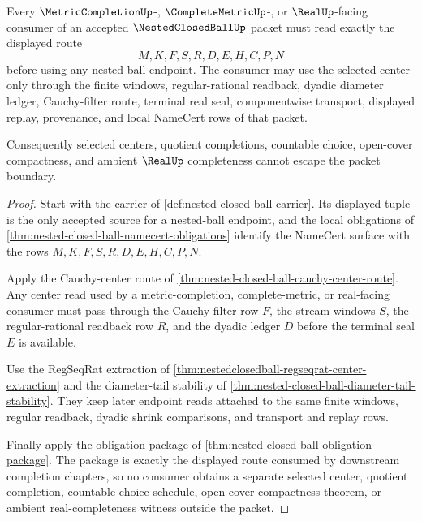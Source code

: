 \begin{theorem}
\label{thm:nested-closed-ball-consumer-nonescape}
Every $\MetricCompletionUp$-, $\CompleteMetricUp$-, or $\RealUp$-facing consumer of an accepted $\NestedClosedBallUp$ packet must read exactly the displayed route
$$
M,K,F,S,R,D,E,H,C,P,N
$$
before using any nested-ball endpoint. The consumer may use the selected center only through the finite windows, regular-rational readback, dyadic diameter ledger, Cauchy-filter route, terminal real seal, componentwise transport, displayed replay, provenance, and local NameCert rows of that packet.

Consequently selected centers, quotient completions, countable choice, open-cover compactness, and ambient $\RealUp$ completeness cannot escape the packet boundary.
\end{theorem}
\begin{proof}
Start with the carrier of \autoref{def:nested-closed-ball-carrier}. Its displayed tuple is the only accepted source for a nested-ball endpoint, and the local obligations of \autoref{thm:nested-closed-ball-namecert-obligations} identify the NameCert surface with the rows $M,K,F,S,R,D,E,H,C,P,N$.

Apply the Cauchy-center route of \autoref{thm:nested-closed-ball-cauchy-center-route}. Any center read used by a metric-completion, complete-metric, or real-facing consumer must pass through the Cauchy-filter row $F$, the stream windows $S$, the regular-rational readback row $R$, and the dyadic ledger $D$ before the terminal seal $E$ is available.

Use the RegSeqRat extraction of \autoref{thm:nestedclosedball-regseqrat-center-extraction} and the diameter-tail stability of \autoref{thm:nested-closed-ball-diameter-tail-stability}. They keep later endpoint reads attached to the same finite windows, regular readback, dyadic shrink comparisons, and transport and replay rows.

Finally apply the obligation package of \autoref{thm:nested-closed-ball-obligation-package}. The package is exactly the displayed route consumed by downstream completion chapters, so no consumer obtains a separate selected center, quotient completion, countable-choice schedule, open-cover compactness theorem, or ambient real-completeness witness outside the packet.
\end{proof}

